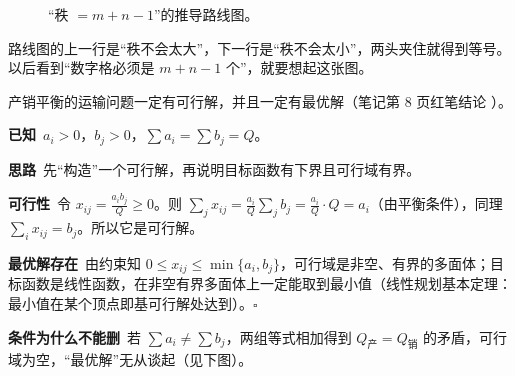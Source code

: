 \begin{figure}[H]
\centering
{}
\caption{“秩 $=m+n-1$”的推导路线图。}\label{fig:rankroute}
\end{figure}
路线图的上一行是“秩不会太大”，下一行是“秩不会太小”，两头夹住就得到等号。以后看到“数字格必须是 $m+n-1$ 个”，就要想起这张图。

\begin{theorembox}[平衡运输问题必有最优解]
产销平衡的运输问题一定有可行解，并且一定有最优解（笔记第 8 页红笔结论 \orig）。
\end{theorembox}
\begin{proofbox}[必有可行解与最优解]
\textbf{已知}\ $a_i>0$，$b_j>0$，$\sum a_i=\sum b_j=Q$。\par
\textbf{思路}\ 先“构造”一个可行解，再说明目标函数有下界且可行域有界。\par
\textbf{可行性}\ 令 $\displaystyle x_{ij}=\frac{a_ib_j}{Q}\ge 0$。则
$\displaystyle\sum_{j}x_{ij}=\frac{a_i}{Q}\sum_j b_j=\frac{a_i}{Q}\cdot Q=a_i$（由平衡条件），同理 $\sum_i x_{ij}=b_j$。所以它是可行解。\par
\textbf{最优解存在}\ 由约束知 $0\le x_{ij}\le\min\{a_i,b_j\}$，可行域是非空、有界的多面体；目标函数是线性函数，在非空有界多面体上一定能取到最小值（线性规划基本定理：最小值在某个顶点即基可行解处达到）。\hfill$\square$\par
\textbf{条件为什么不能删}\ 若 $\sum a_i\ne\sum b_j$，两组等式相加得到 $Q_{\text{产}}=Q_{\text{销}}$ 的矛盾，可行域为空，“最优解”无从谈起（见下图）。
\end{proofbox}

